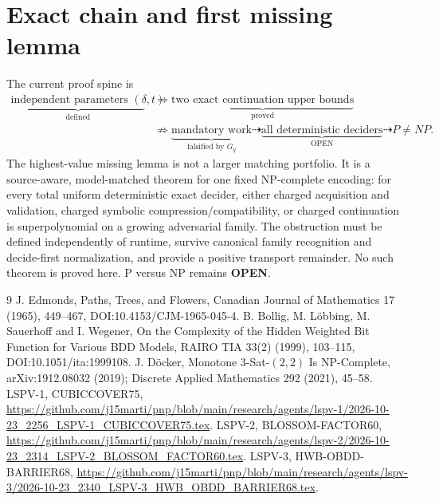 \documentclass[11pt]{article}
\begin{document}
\section{Exact chain and first missing lemma}
The current proof spine is
\[
\begin{aligned}
\underbrace{\text{independent parameters }(\delta,t)}_{\text{defined}}
&\Longrightarrow
\underbrace{\text{two exact continuation upper bounds}}_{\text{proved}}\\
&\not\Longrightarrow
\underbrace{\text{mandatory work}}_{\text{falsified by }G_q}
\dashrightarrow
\underbrace{\text{all deterministic deciders}}_{\text{OPEN}}
\dashrightarrow P\ne NP.
\end{aligned}
\]
The highest-value missing lemma is not a larger matching portfolio.  It is a
source-aware, model-matched theorem for one fixed NP-complete encoding: for
every total uniform deterministic exact decider, either charged acquisition
and validation, charged symbolic compression/compatibility, or charged
continuation is superpolynomial on a growing adversarial family.  The
obstruction must be defined independently of runtime, survive canonical
family recognition and decide-first normalization, and provide a positive
transport remainder.  No such theorem is proved here.  P versus NP remains
\textbf{OPEN}.

\begin{thebibliography}{9}
 J. Edmonds, Paths, Trees, and Flowers, Canadian Journal of Mathematics 17 (1965), 449--467, DOI:10.4153/CJM-1965-045-4.
 B. Bollig, M. L\"obbing, M. Sauerhoff and I. Wegener, On the Complexity of the Hidden Weighted Bit Function for Various BDD Models, RAIRO TIA 33(2) (1999), 103--115, DOI:10.1051/ita:1999108.
 J. D\"ocker, Monotone 3-Sat-$(2,2)$ Is NP-Complete, arXiv:1912.08032 (2019); Discrete Applied Mathematics 292 (2021), 45--58.
 LSPV-1, CUBICCOVER75, \url{https://github.com/j15marti/pnp/blob/main/research/agents/lspv-1/2026-10-23_2256_LSPV-1_CUBICCOVER75.tex}.
 LSPV-2, BLOSSOM-FACTOR60, \url{https://github.com/j15marti/pnp/blob/main/research/agents/lspv-2/2026-10-23_2314_LSPV-2_BLOSSOM_FACTOR60.tex}.
 LSPV-3, HWB-OBDD-BARRIER68, \url{https://github.com/j15marti/pnp/blob/main/research/agents/lspv-3/2026-10-23_2340_LSPV-3_HWB_OBDD_BARRIER68.tex}.
\end{thebibliography}
\end{document}
